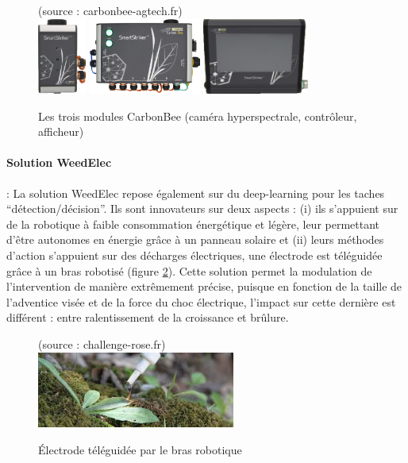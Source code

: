 \documentclass[../thesis.tex]{subfiles}
\begin{document}
    \begin{figure}[H]
        \centering
        {\scriptsize (source : carbonbee-agtech.fr)} \\
        \includegraphics[height=2.5cm]{img/intro/anr-pead-01} \hspace{1em}
        \includegraphics[height=2.5cm]{img/intro/anr-pead-02} \hspace{1em}
        \includegraphics[height=2.5cm]{img/intro/anr-pead-03}
        \caption{Les trois modules CarbonBee (caméra hyperspectrale, contrôleur, afficheur)}
        \label{fig:02-anr-pead}
    \end{figure}
    
    \paragraph{Solution WeedElec} : La solution WeedElec repose également sur du deep-learning pour les taches ``détection/décision''. Ils sont innovateurs sur deux aspects : (i) ils s'appuient sur de la robotique à faible consommation énergétique et légère, leur permettant d'être autonomes en énergie grâce à un panneau solaire et (ii) leurs méthodes d'action s'appuient sur des décharges électriques, une électrode est téléguidée grâce à un bras robotisé (figure \ref{fig:02-anr-weedelec}). Cette solution permet la modulation de l'intervention de manière extrêmement précise, puisque en fonction de la taille de l'adventice visée et de la force du choc électrique, l'impact sur cette dernière est différent : entre ralentissement de la croissance et brûlure.
    
    \begin{figure}[H]
        \centering
        {\scriptsize (source : challenge-rose.fr)} \\
        \includegraphics[height=2.5cm]{img/intro/anr-weedelec}
        \caption{Électrode téléguidée par le bras robotique}
        \label{fig:02-anr-weedelec}
    \end{figure}
    
\end{document}
